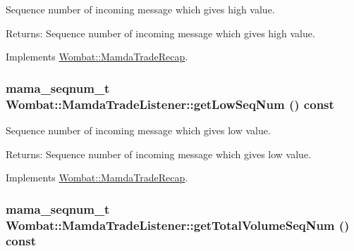 Sequence number of incoming message which gives high value. 

\begin{Desc}
\item[Returns:]Sequence number of incoming message which gives high value. \end{Desc}


Implements \hyperlink{classWombat_1_1MamdaTradeRecap_f87da76851c02f0248c635836b7260ae}{Wombat::Mamda\-Trade\-Recap}.\hypertarget{classWombat_1_1MamdaTradeListener_5b4c5e492cb7d005e416e21c7ef819f2}{
\subsubsection[getLowSeqNum]{\setlength{\rightskip}{0pt plus 5cm}mama\_\-seqnum\_\-t Wombat::Mamda\-Trade\-Listener::get\-Low\-Seq\-Num () const}}
\label{classWombat_1_1MamdaTradeListener_5b4c5e492cb7d005e416e21c7ef819f2}


Sequence number of incoming message which gives low value. 

\begin{Desc}
\item[Returns:]Sequence number of incoming message which gives low value. \end{Desc}


Implements \hyperlink{classWombat_1_1MamdaTradeRecap_459c619eee736e8cfc32f4ff45873d16}{Wombat::Mamda\-Trade\-Recap}.\hypertarget{classWombat_1_1MamdaTradeListener_e51bb722030a31e634fb64cba119cbd1}{
\subsubsection[getTotalVolumeSeqNum]{\setlength{\rightskip}{0pt plus 5cm}mama\_\-seqnum\_\-t Wombat::Mamda\-Trade\-Listener::get\-Total\-Volume\-Seq\-Num () const}}
\label{classWombat_1_1MamdaTradeListener_e51bb722030a31e634fb64cba119cbd1}




